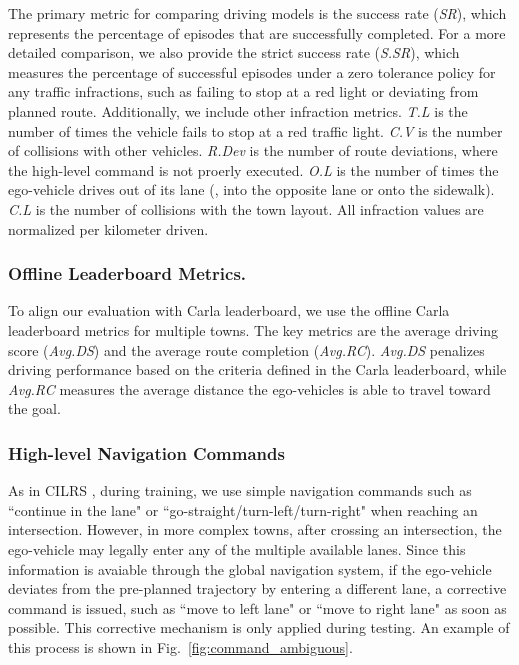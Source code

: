 The primary metric for comparing driving models is the success rate (\emph{SR}), which represents the percentage of episodes that are successfully completed. 
For a more detailed comparison, we also provide the strict success rate (\emph{S.SR}),
which measures the percentage of successful episodes under a zero tolerance policy for any traffic infractions, such as failing to stop at a red light or deviating from planned route.
Additionally, we include other infraction metrics.
\emph{T.L} is the number of times the vehicle fails to stop at a red traffic light.
\emph{C.V} is the number of collisions with other vehicles.
\emph{R.Dev} is the number of route deviations, where the high-level command is not proerly executed.
\emph{O.L} is the number of times the ego-vehicle drives out of its lane ({\eg}, into the opposite lane or onto the sidewalk).
\emph{C.L} is the number of collisions with the town layout. 
All infraction values are normalized per kilometer driven.


\subsubsection{Offline Leaderboard Metrics.}\label{lb_metrics}
\hspace{1pc}To align our evaluation with Carla leaderboard\cite{Hu:2022}, we use the offline Carla leaderboard metrics for multiple towns. 
The key metrics are the average driving score (\emph{Avg.DS}) and the average route completion (\emph{Avg.RC}). 
\emph{Avg.DS} penalizes driving performance based on the criteria defined in the Carla leaderboard, 
while \emph{Avg.RC} measures the average distance the ego-vehicles is able to travel toward the goal.


\subsubsection{High-level Navigation Commands} 
\hspace{1pc}As in CILRS \cite{Codevilla:2019}, during training, we use simple navigation commands such as ``continue in the lane" or ``go-straight/turn-left/turn-right" when reaching an intersection.
However, in more complex towns, after crossing an intersection, the ego-vehicle may legally enter any of the multiple available lanes. 
Since this information is avaiable through the global navigation system, if the ego-vehicle deviates from the pre-planned trajectory by entering a different lane, a corrective command is issued, such as ``move to left lane" or ``move to right lane" as soon as possible. 
This corrective mechanism is only applied during testing. 
An example of this process is shown in Fig.~\ref{fig:command_ambiguous}.



